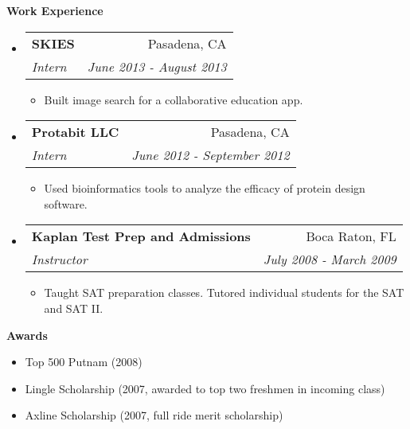 \documentclass[letterpaper,11pt]{article}
\makeatletter
\newcommand{\resitem}[1]{\item #1 \vspace{-2pt}}
\newcommand{\resheading}[1]{{\large \colorbox{mygrey}{\begin{minipage}{\textwidth}{\textbf{#1 \vphantom{p\^{E}}}}\end{minipage}}}}
\newcommand{\ressubheading}[4]{
\begin{tabular*}{7.0in}{l@{\extracolsep{\fill}}r}
		\textbf{#1} & #2 \\
		\textit{#3} & \textit{#4}\\
\end{tabular*}\vspace{-6pt}}
\makeatother
\begin{document}
\resheading{Work Experience}
\begin{itemize}
\item
	\ressubheading{SKIES}{Pasadena, CA}{Intern}{June 2013 - August 2013}
	\begin{itemize}
		\resitem{Built image search for a collaborative education app.}
	\end{itemize}
\item
	\ressubheading{Protabit LLC}{Pasadena, CA}{Intern}{June 2012 - September 2012}
	\begin{itemize}
		\resitem{Used bioinformatics tools to analyze the efficacy of protein design software.}
	\end{itemize}
\item
	\ressubheading{Kaplan Test Prep and Admissions}{Boca Raton, FL}{Instructor}{July 2008 - March 2009}
	\begin{itemize}
		\resitem{Taught SAT preparation classes.  Tutored individual students for the SAT and SAT II.}
	\end{itemize}
\end{itemize}

\resheading{Awards}
\begin{itemize}
	\item Top 500 Putnam (2008)
	\item Lingle Scholarship (2007, awarded to top two freshmen in incoming class)
	\item Axline Scholarship (2007, full ride merit scholarship)
\end{itemize}
\end{document}
